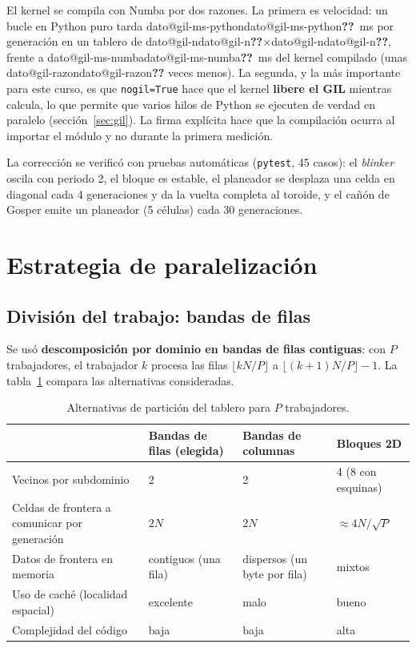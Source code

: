\documentclass[11pt,a4paper]{article}
\makeatletter
\newcommand{\dato}[1]{\ifcsname dato@#1\endcsname\csname dato@#1\endcsname\else\textbf{\color{red}??}\fi}
\newcommand{\x}{$\times$}
\newcommand{\code}[1]{\texttt{#1}}
\makeatother
\begin{document}
El kernel se compila con Numba \cite{numba} por dos razones. La primera es velocidad: un bucle en Python puro
tarda \dato{gil-ms-python}~ms por generación en un tablero de \dato{gil-n}\x\dato{gil-n}, frente a
\dato{gil-ms-numba}~ms del kernel compilado (unas \dato{gil-razon} veces menos). La segunda, y la más importante para este curso,
es que \code{nogil=True} hace que el kernel \textbf{libere el GIL} mientras calcula, lo que permite que
varios hilos de Python se ejecuten de verdad en paralelo (sección~\ref{sec:gil}). La firma explícita hace
que la compilación ocurra al importar el módulo y no durante la primera medición.

La corrección se verificó con pruebas automáticas (\code{pytest}, 45 casos): el \emph{blinker} oscila con
periodo 2, el bloque es estable, el planeador se desplaza una celda en diagonal cada 4 generaciones y da la
vuelta completa al toroide, y el cañón de Gosper emite un planeador (5 células) cada 30 generaciones.

\section{Estrategia de paralelización}\label{sec:estrategia}

\subsection{División del trabajo: bandas de filas}

Se usó \textbf{descomposición por dominio en bandas de filas contiguas}: con $P$ trabajadores, el trabajador
$k$ procesa las filas $\lfloor kN/P\rfloor$ a $\lfloor (k+1)N/P\rfloor - 1$. La tabla~\ref{tab:particion}
compara las alternativas consideradas.

\begin{table}[H]
\centering\small
\caption{Alternativas de partición del tablero para $P$ trabajadores.}\label{tab:particion}
\begin{tabularx}{\textwidth}{lXXX}
\toprule
 & \textbf{Bandas de filas} (elegida) & \textbf{Bandas de columnas} & \textbf{Bloques 2D} \\
\midrule
Vecinos por subdominio & 2 & 2 & 4 (8 con esquinas) \\
Celdas de frontera a comunicar por generación & $2N$ & $2N$ & $\approx 4N/\sqrt{P}$ \\
Datos de frontera en memoria & contiguos (una fila) & dispersos (un byte por fila) & mixtos \\
Uso de caché (localidad espacial) & excelente & malo & bueno \\
Complejidad del código & baja & baja & alta \\
\bottomrule
\end{tabularx}
\end{table}
\end{document}
